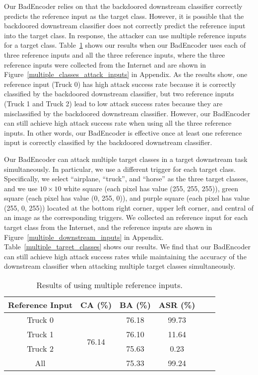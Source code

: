  Our BadEncoder relies on that  the backdoored downstream classifier correctly predicts the   reference input as the target class. However, it is possible that the backdoored downstream classifier does not correctly predict the reference input into the target class. In response, the attacker can use multiple reference inputs for a target class. Table~\ref{multiple_attack_inputs} shows our  results when our BadEncoder uses each of three reference inputs and all the three reference inputs, where the three reference inputs were collected from the Internet and are shown in Figure~\ref{multiple_classes_attack_inputs} in Appendix. As the results show, one reference input (Truck 0) has high attack success rate because it is correctly classified by the backdoored downstream classifier, but  two reference inputs (Truck 1 and Truck 2) lead to low attack success rates because they are misclassified by the backdoored downstream classifier. 
However,  our BadEncoder  can still achieve high attack success rate when using all the three reference inputs. In other words, our BadEncoder is effective once at least one reference input is correctly classified by the backdoored downstream classifier. 

 Our BadEncoder can  attack multiple target classes in a target downstream task simultaneously. In particular, we use a different trigger for each target class. Specifically, we select ``airplane, ``truck'', and ``horse'' as the three target classes, and we use $10 \times 10$ white square (each pixel has value (255, 255, 255)), green square (each pixel has value (0, 255, 0)), and purple square (each pixel has value (255, 0, 255)) located at the bottom right corner, upper left corner, and central of an image as the corresponding triggers. We collected an reference input for each target class from the Internet, and the reference inputs are shown in Figure~\ref{multiple_downstream_inputs} in Appendix.   Table~\ref{multiple_target_classes} shows our  results. We find that our BadEncoder can still achieve high attack success rates while maintaining the accuracy of the downstream classifier when attacking multiple target classes simultaneously. 



\begin{table}[tp]\renewcommand{\arraystretch}{1.2} 
	\centering
	\caption{Results of using multiple reference inputs. } 
	\begin{tabular}{|c|c|c|c|c|c|}
		\hline
	 Reference Input & CA (\%) & BA (\%) & ASR (\%)   \\ \hline
		Truck 0 & \multirow{4}{*}{76.14} & 76.18 & 99.73 \\ \cline{1-1}  \cline{3-4} 
		Truck 1 & & 76.10 & 11.64  \\ \cline{1-1}  \cline{3-4} 
		Truck 2 &  & 75.63 & 0.23 \\ \cline{1-1}  \cline{3-4} 
		All &  & 75.33 & 99.24  \\ \cline{1-4} 
	\end{tabular}
	\label{multiple_attack_inputs}
\end{table}

